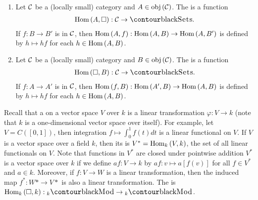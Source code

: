     \begin{example}
        \phantom{a}
        \begin{enumerate}[label = (\arabic*)]
            \item Let $\mathcal{C}$ be a (locally small) category and $A \in \operatorname{obj}{(\mathcal{C})}$. The  is a function 
                \begin{equation*}
                \begin{split}
                    \Hom{(A,\square)}:\mC \rightarrow \cSets.
                \end{split}
                \end{equation*}
            If $f:B \rightarrow B'$ is in $\mathcal{C}$, then $\operatorname{Hom}{(A,f)}:\operatorname{Hom}{(A,B)} \rightarrow \operatorname{Hom}{(A,B')}$ is defined by $h \mapsto hf$ for each $h \in \operatorname{Hom}{(A,B)}$.

            \item Let $\mathcal{C}$ be a (locally small) category and $B \in \operatorname{obj}{(\mathcal{C})}$. The  is a function
                \begin{equation*}
                \begin{split}
                    \Hom{(\square,B)}:\mC \rightarrow \cSets.
                \end{split}
                \end{equation*}
            If $f:A \rightarrow A'$ is in $\mathcal{C}$, then $\operatorname{Hom}{(f,B)}:\operatorname{Hom}{(A',B)} \rightarrow \operatorname{Hom}{(A,B)}$ is defined by $h \mapsto hf$ for each $h \in \operatorname{Hom}{(A,B)}$.
        \end{enumerate} 
    \end{example}

    \begin{example}
        Recall that a  on a vector space $V$ over $k$ is a linear transformation $\varphi:V \rightarrow k$ (note that $k$ is a one-dimensional vector space over itself). For example, let $V = C([0,1])$, then integration $f \mapsto \int_{0}^{1}f(t)dt$ is a linear functional on $V$. If $V$ is a vector space over a field $k$, then its  is $V^* = \operatorname{Hom}_k{(V,k)}$, the set of all linear functionals on $V$. Note that functions in $V^*$ are closed under pointwise addition \textemdash  $V^*$ is a vector space over $k$ if we define $af: V \rightarrow k$ by $af: v \mapsto a[f(v)]$ for all $f \in V^* $ and $ a \in k$. Moreover, if $f: V \rightarrow W$ is a linear transformation, then the induced map $f^*: W* \rightarrow V*$ is also a linear transformation. The  is $\Hom_k{(\square,k)}: {}_{k}\cMod \rightarrow {}_{k}\cMod$.
    \end{example}


